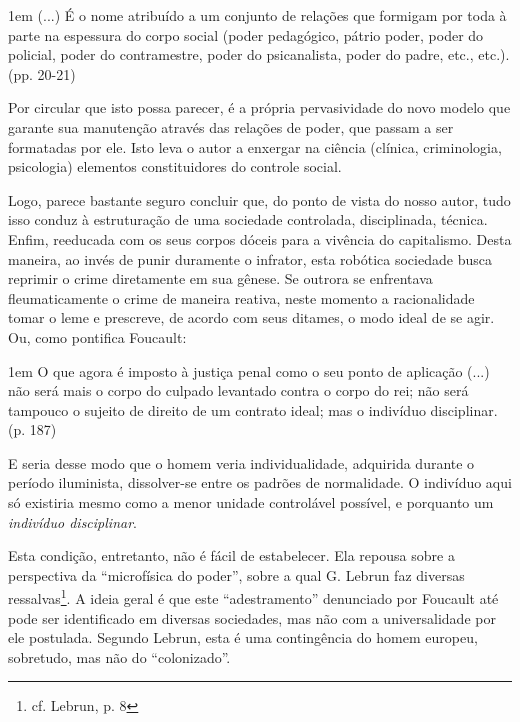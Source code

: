 \documentclass[12pt,a4paper]{article}
\newenvironment{citac}
{
	\begin{addmargin}
		[4cm]{1em} \footnotesize}{\normalfont 
	\end{addmargin}
}
\begin{document}
	\begin{citac}
		(...) É o nome atribuído a um conjunto de relações que 
		formigam por toda à parte na espessura do corpo social 
		(poder pedagógico, pátrio poder, poder do policial, poder 
		do contramestre, poder do psicanalista, poder do padre, 
		etc., etc.). \cite{lebrun} (pp. 20-21)
	\end{citac}

	Por circular que isto possa parecer, é a própria pervasividade 
	do novo modelo que garante sua manutenção através das relações 
	de poder, que passam a ser formatadas por ele. Isto leva o 
	autor a enxergar na ciência (clínica, criminologia, psicologia) 
	elementos constituidores do controle social. 

	Logo, parece bastante seguro concluir que, do ponto de vista do nosso 
	autor, tudo isso conduz à estruturação de uma sociedade controlada, 
	disciplinada, técnica. Enfim, reeducada com os seus corpos dóceis 
	para a vivência do capitalismo. Desta maneira, ao invés de punir duramente 
	o infrator, esta robótica sociedade busca reprimir o crime diretamente 
	em sua gênese. Se outrora se enfrentava fleumaticamente o crime 
	de maneira reativa, neste momento a racionalidade tomar o leme e 
	prescreve, de acordo com seus ditames, o modo ideal de se agir. 
	Ou, como pontifica Foucault: 

	\begin{citac}
		O que agora é imposto à justiça penal como o seu ponto de 
		aplicação (...) não será mais o corpo do culpado levantado 
		contra o corpo do rei; não será tampouco o sujeito de 
		direito de um contrato ideal; mas o indivíduo disciplinar. 
		\cite{foucault} (p. 187)
	\end{citac}

	E seria desse  modo que o homem veria individualidade, adquirida durante
	o período iluminista, dissolver-se entre os padrões de normalidade. 
	O indivíduo aqui só existiria mesmo como a menor unidade controlável 
	possível, e porquanto um \textit{indivíduo disciplinar}. 

	Esta condição, entretanto, não é fácil de estabelecer. Ela repousa 
	sobre a perspectiva da ``microfísica do poder'', sobre a qual 
	G. Lebrun faz diversas ressalvas\footnote{cf. Lebrun, p. 8}. 
	A ideia geral é que este ``adestramento'' denunciado por Foucault 
	até pode ser identificado em diversas sociedades, mas não com a 
	universalidade por ele postulada. Segundo Lebrun, esta é uma 
	contingência do homem europeu, sobretudo, mas não do ``colonizado''. 
\end{document}
